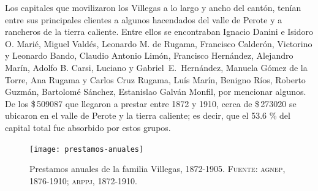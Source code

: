 \documentclass[14pt,twoside,final]{extbook} %
\begin{document}
Los capitales que movilizaron los Villegas a lo largo y ancho del cantón, tenían entre sus principales clientes a algunos hacendados del valle de Perote y a rancheros de la tierra caliente. Entre ellos se encontraban Ignacio Danini e Isidoro O. Marié, Miguel Valdés, Leonardo M. de Rugama, Francisco Calderón, Victorino y Leonardo Bando, Claudio Antonio Limón, Francisco Hernández, Alejandro Marín, Adolfo B. Carsi, Luciano y Gabriel~E.~Hernández, Manuela Gómez de la Torre, Ana Rugama y Carlos Cruz Rugama, Luís Marín, Benigno Ríos, Roberto Guzmán, Bartolomé Sánchez, Estanislao Galván Monfil, por mencionar algunos. De los \$\,509087 que llegaron a prestar entre 1872 y 1910, cerca de \$\,273020 se ubicaron en el valle de Perote y la tierra caliente; es decir, que el 53.6 \% del capital total fue absorbido por estos grupos.
\begin{figure}
\texttt{[image: prestamos-anuales]}
\caption[Préstamos anuales de la familia Villegas, 1872-1905]{Prestamos anuales de la familia Villegas, 1872-1905. \textsc{Fuente:} \textsc{agnep}, 1876-1910; \textsc{arppj, 1872-1910}.}
\label{fig:prestamos-anuales-familia-villegas}
\end{figure}
\end{document}
